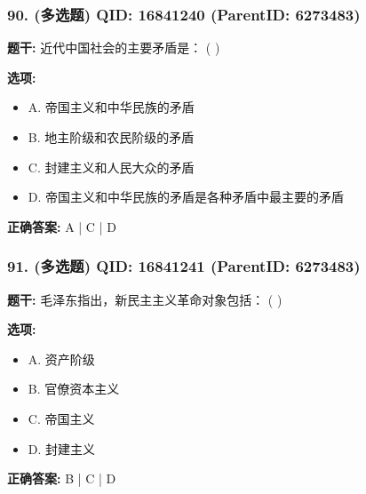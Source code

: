 \documentclass[12pt,UTF8]{ctexart}
\begin{document}
\subsubsection*{90. (多选题) \small QID: 16841240 (ParentID: 6273483)}

\textbf{题干:}
近代中国社会的主要矛盾是： ( )



\textbf{选项:}
\begin{itemize}[leftmargin=*]

  \item A. 帝国主义和中华民族的矛盾

  \item B. 地主阶级和农民阶级的矛盾

  \item C. 封建主义和人民大众的矛盾

  \item D. 帝国主义和中华民族的矛盾是各种矛盾中最主要的矛盾

\end{itemize}

\textbf{正确答案:}
A | C | D

\vspace{0.3em}\hrulefill\vspace{0.7em}

\subsubsection*{91. (多选题) \small QID: 16841241 (ParentID: 6273483)}

\textbf{题干:}
毛泽东指出，新民主主义革命对象包括： ( )



\textbf{选项:}
\begin{itemize}[leftmargin=*]

  \item A. 资产阶级

  \item B. 官僚资本主义

  \item C. 帝国主义

  \item D. 封建主义

\end{itemize}

\textbf{正确答案:}
B | C | D

\vspace{0.3em}\hrulefill\vspace{0.7em}
\end{document}

